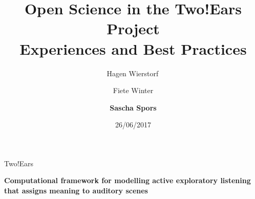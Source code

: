 \documentclass{beamer}
\begin{document}
\title{\centering Open Science in the Two!Ears Project \\ Experiences and Best Practices}
\author{Hagen Wierstorf$\,$ \and
        Fiete Winter \and
        \textbf{Sascha Spors}}
\date{26/06/2017}
\maketitle

\begin{frame}{Two!Ears}

    \begin{center}
        \vspace{0.5cm}
        \textbf{Computational framework for modelling active exploratory
        listening that assigns meaning to auditory scenes}

        \vspace{0.5cm}


\end{center}
\end{frame}
\end{document}
